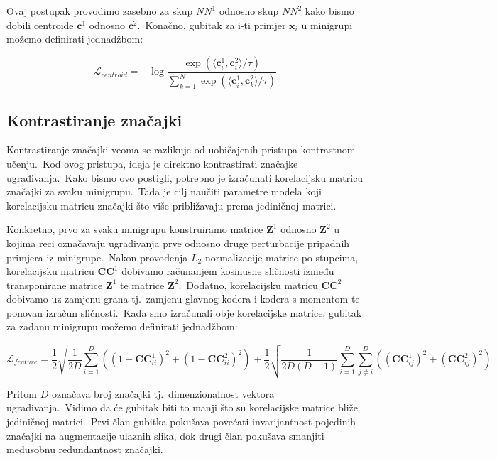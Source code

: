 \documentclass[diplomskirad]{fer}
\begin{document}
\pagebreak

Ovaj postupak provodimo zasebno za skup $NN^1$ odnosno skup $NN^2$ kako bismo dobili centroide $\bm{c}^1$ odnosno $\bm{c}^2$.\ Konačno, gubitak za i-ti primjer $\bm{x}_i$ u minigrupi možemo definirati jednadžbom:

\begin{equation}
  \mathcal{L}_{centroid} = - \log{\frac{\exp(\langle \bm{c}_{i}^{1}, \bm{c}_{i}^{2} \rangle / \tau)}{\sum_{k=1}^{N}{\exp(\langle \bm{c}_{i}^{1}, \bm{c}_{k}^{2} \rangle / \tau)}}}
  \label{eq:centroid_loss}
\end{equation}

\subsection{Kontrastiranje značajki}
\label{sub:features}
  
Kontrastiranje značajki veoma se razlikuje od uobičajenih pristupa kontrastnom učenju.\ Kod ovog pristupa, ideja je direktno kontrastirati značajke ugrađivanja.\ 
Kako bismo ovo postigli, potrebno je izračunati korelacijsku matricu značajki za svaku minigrupu.\ Tada je cilj naučiti parametre modela koji korelacijsku matricu značajki što više približavaju prema jediničnoj matrici.\ 

Konkretno, prvo za svaku minigrupu konstruiramo matrice $\bm{Z}^1$ odnosno $\bm{Z}^2$ u kojima reci označavaju ugrađivanja prve odnosno druge perturbacije pripadnih primjera iz minigrupe.\ 
Nakon provođenja $L_2$ normalizacije matrice po stupcima, korelacijsku matricu $\bm{CC}^1$ dobivamo računanjem kosinusne sličnosti između transponirane matrice $\bm{Z}^1$ te matrice $\bm{Z}^2$.\ 
Dodatno, korelacijsku matricu $\bm{CC}^2$ dobivamo uz zamjenu grana tj.\ zamjenu glavnog kodera i kodera s momentom te ponovan izračun sličnosti.\ 
Kada smo izračunali obje korelacijske matrice, gubitak za zadanu minigrupu možemo definirati jednadžbom:

\begin{equation}
  \mathcal{L}_{feature} = \frac{1}{2} \sqrt{\frac{1}{2D}\sum_{i=1}^{D}((1 - \bm{CC}_{ii}^1)^2 + (1 - \bm{CC}_{ii}^2)^2)} + \frac{1}{2} \sqrt{\frac{1}{2D(D - 1)}\sum_{i=1}^{D}\sum_{j \neq i}^{D}((\bm{CC}_{ij}^1)^2 + (\bm{CC}_{ij}^2)^2)}
  \label{eq:feature_loss}
\end{equation}

Pritom $D$ označava broj značajki tj.\ dimenzionalnost vektora ugrađivanja.\ Vidimo da će gubitak biti to manji što su korelacijske matrice bliže jediničnoj matrici.\ 
Prvi član gubitka pokušava povećati invarijantnost pojedinih značajki na augmentacije ulaznih slika, dok drugi član pokušava smanjiti međusobnu redundantnost značajki.\ 
\end{document}
